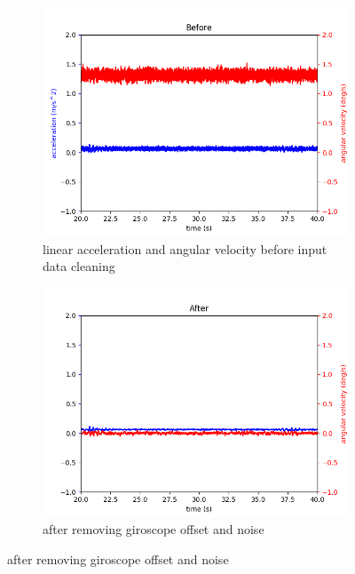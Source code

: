 \begin{figure}[H]
\begin{subfigure}[h]{0.5\linewidth}
\includegraphics[width=0.5\linewidth]{data_preprocessing_before.png}
\caption{linear acceleration and angular velocity before input data cleaning}
\end{subfigure}
\hfill
\begin{subfigure}[h]{0.5\linewidth}
\includegraphics[width=0.5\linewidth]{data_preprocessing_after.png}
\caption{after removing giroscope offset and noise}
\end{subfigure}
\end{figure}

